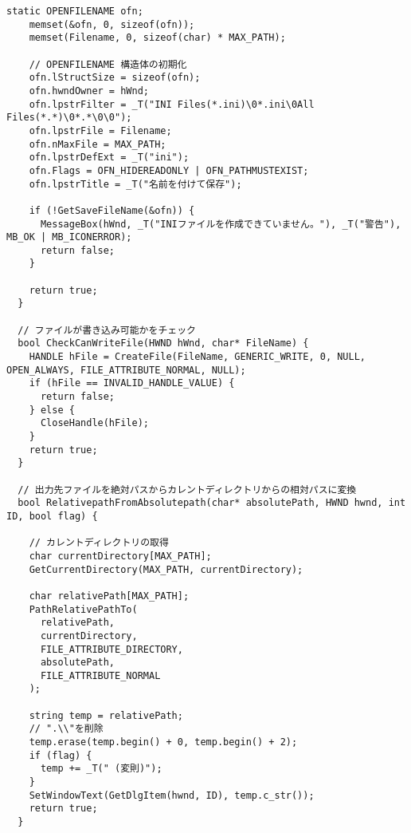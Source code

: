 \begin{lstlisting}[caption=file.cpp]
    static OPENFILENAME ofn;
    memset(&ofn, 0, sizeof(ofn));
    memset(Filename, 0, sizeof(char) * MAX_PATH);

    // OPENFILENAME 構造体の初期化
    ofn.lStructSize = sizeof(ofn);
    ofn.hwndOwner = hWnd;
    ofn.lpstrFilter = _T("INI Files(*.ini)\0*.ini\0All Files(*.*)\0*.*\0\0");
    ofn.lpstrFile = Filename;
    ofn.nMaxFile = MAX_PATH;
    ofn.lpstrDefExt = _T("ini");
    ofn.Flags = OFN_HIDEREADONLY | OFN_PATHMUSTEXIST;
    ofn.lpstrTitle = _T("名前を付けて保存");

    if (!GetSaveFileName(&ofn)) {
      MessageBox(hWnd, _T("INIファイルを作成できていません。"), _T("警告"), MB_OK | MB_ICONERROR);
      return false;
    }

    return true;
  }

  // ファイルが書き込み可能かをチェック
  bool CheckCanWriteFile(HWND hWnd, char* FileName) {
    HANDLE hFile = CreateFile(FileName, GENERIC_WRITE, 0, NULL, OPEN_ALWAYS, FILE_ATTRIBUTE_NORMAL, NULL);
    if (hFile == INVALID_HANDLE_VALUE) {
      return false;
    } else {
      CloseHandle(hFile);
    }
    return true;
  }

  // 出力先ファイルを絶対パスからカレントディレクトリからの相対パスに変換
  bool RelativepathFromAbsolutepath(char* absolutePath, HWND hwnd, int ID, bool flag) {

    // カレントディレクトリの取得
    char currentDirectory[MAX_PATH];
    GetCurrentDirectory(MAX_PATH, currentDirectory);

    char relativePath[MAX_PATH];
    PathRelativePathTo(
      relativePath,
      currentDirectory,
      FILE_ATTRIBUTE_DIRECTORY,
      absolutePath,
      FILE_ATTRIBUTE_NORMAL
    );

    string temp = relativePath;
    // ".\\"を削除
    temp.erase(temp.begin() + 0, temp.begin() + 2);
    if (flag) {
      temp += _T(" (変則)");
    }
    SetWindowText(GetDlgItem(hwnd, ID), temp.c_str());
    return true;
  }

  \end{lstlisting}


